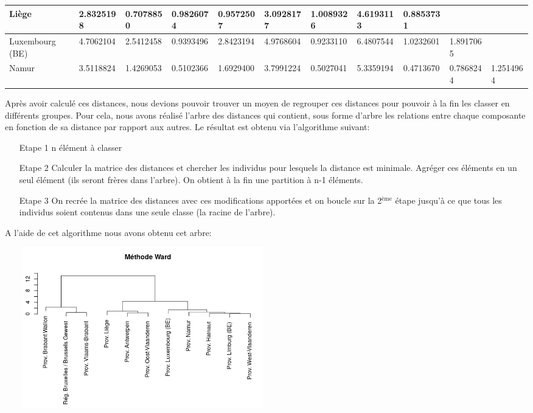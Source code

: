 \documentclass{article}
\begin{document}
\begin{tabularx}{18.4cm}{|X|X|X|X|X|X|X|X|X|X|X|}
	\hline
	Liège                               &2.8325198       &0.7078850          &0.9826074            & 0.9572507            &3.0928177             &1.0089326            &4.6193113     &0.8853731                                  &&\\
	\hline
	Luxembourg (BE)                     &4.7062104       &2.5412458          &0.9393496             &2.8423194            &4.9768604             &0.9233110            &6.4807544     &1.0232601   &1.8917065                      &\\
	\hline
	Namur                         &3.5118824       &1.4269053          &0.5102366             &1.6929400            &3.7991224             &0.5027041            &5.3359194     &0.4713670   &0.7868244             &1.2514964\\
	\hline
\end{tabularx}
	
	Après avoir calculé ces distances, nous devions pouvoir trouver un moyen de regrouper ces distances pour pouvoir à la fin les classer en différents groupes. Pour cela, nous avons réalisé l'arbre des distances qui contient, sous forme d'arbre les relations entre chaque composante en fonction de sa distance par rapport aux autres. Le résultat est obtenu via l'algorithme suivant:
	
	\begin{itemize}
		\item[Etape 1] n élément à classer
		\item[Etape 2] Calculer la matrice des distances et chercher les individus pour lesquels la distance est minimale. 
		Agréger ces éléments en un seul élément (ils seront frères dans l'arbre). On obtient à la fin une partition à n-1 éléments.
		\item[Etape 3] On recrée la matrice des distances avec ces modifications apportées et on boucle sur la 2$^{\text{ème}}$ étape jusqu'à ce que tous les individus soient contenus dans une seule classe (la racine de l'arbre).
	\end{itemize}
	
	A l'aide de cet algorithme nous avons obtenu cet arbre:
	
		\includegraphics[width=12cm,height=7cm]{tree}
	
\end{document}
